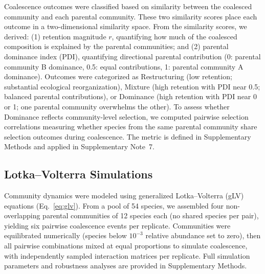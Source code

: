 Coalescence outcomes were classified based on similarity between the coalesced community and each parental community.  These two similarity scores place each outcome in a two-dimensional similarity space. From the similarity scores, we derived: (1) retention magnitude $r$, quantifying how much of the coalesced composition is explained by the parental communities; and (2) parental dominance index (PDI), quantifying directional parental contribution (0: parental community B dominance, 0.5: equal contributions, 1: parental community A dominance).  Outcomes were categorized as Restructuring (low retention; substantial ecological reorganization), Mixture (high retention with PDI near 0.5; balanced parental contributions), or Dominance (high retention with PDI near 0 or 1; one parental community overwhelms the other). To assess whether Dominance reflects community-level selection, we computed pairwise selection correlations measuring whether species from the same parental community share selection outcomes during coalescence. The metric is defined in Supplementary Methods and applied in Supplementary Note~7.


\subsection*{Lotka--Volterra Simulations}
\label{sec:methods:simulations}

Community dynamics were modeled using generalized Lotka--Volterra (gLV) equations (Eq.~\ref{eq:glv}).  From a pool of 54 species, we assembled four non-overlapping parental communities of 12 species each (no shared species per pair), yielding six pairwise coalescence events per replicate. Communities were equilibrated numerically (species below $10^{-3}$ relative abundance set to zero), then all pairwise combinations mixed at equal proportions to simulate coalescence, with independently sampled interaction matrices per replicate. Full simulation parameters and robustness analyses are provided in Supplementary Methods.



